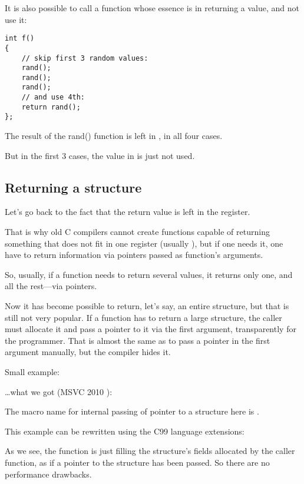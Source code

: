 It is also possible to call a function whose essence is in returning a value, and not use it:

\begin{lstlisting}[style=customc]
int f()
{
    // skip first 3 random values:
    rand();
    rand();
    rand();
    // and use 4th:
    return rand();
};
\end{lstlisting}

The result of the rand() function is left in \EAX, in all four cases.

But in the first 3 cases, the value in \EAX is just not used.

\subsection{Returning a structure}


Let's go back to the fact that the return value is left in the \EAX register.

That is why old C compilers cannot create functions capable of returning something that does not fit in one 
register (usually \Tint), but if one needs it, one have to return information via pointers passed 
as function's arguments.

So, usually, if a function needs to return several values, it returns only one, and 
all the rest---via pointers.

Now it has become possible to return, let's say, an entire structure, but that is still not very popular. 
If a function has to return a large structure, the \gls{caller} must allocate it and pass a pointer to it via the first argument, transparently for the programmer. 
That is almost the same as to pass a pointer in the first argument manually, but the compiler hides it.

Small example:



\dots what we got (MSVC 2010 \Ox):



The macro name for internal passing of pointer to a structure here is .

This example can be rewritten using
the C99 language extensions:





As we see, the function is just filling the structure's fields allocated by
the caller function,
as if a pointer to the structure has been passed.
So there are no performance drawbacks.
